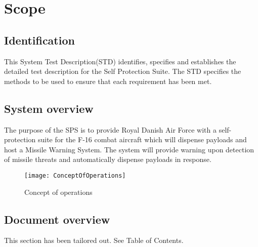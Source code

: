 \documentclass[Main]{subfiles}
\begin{document}
\chapter{Scope}

\section{Identification}
This System Test Description(STD) identifies, specifies and establishes the detailed test description for the Self Protection Suite.
The STD specifies the methods to be used to ensure that each requirement has been met. 

\section{System overview}
The purpose of the SPS is to provide Royal Danish Air Force with a self-protection suite for the F-16 combat aircraft which will dispense payloads and host a Missile Warning System. 
The system will provide warning upon detection of missile threats and automatically dispense payloads in response.

\begin{figure}[H]
\centering
\texttt{[image: ConceptOfOperations]}
\caption{Concept of operations}
\end{figure}


\section{Document overview}
This section has been tailored out. See Table of Contents.
\end{document}
